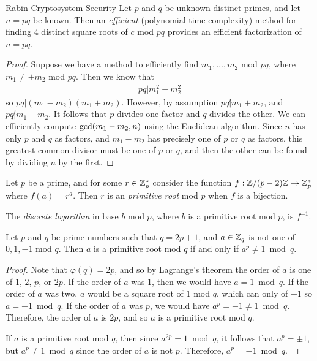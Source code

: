 \begin{thm}{Rabin Cryptosystem Security}\proofbreak
    Let $p$ and $q$ be unknown distinct primes, and let $n = pq$ be known. Then an \emph{efficient} (polynomial time complexity) method for finding $4$ distinct square roots of $c$ mod $pq$ provides an efficient factorization of $n = pq$.
\end{thm}

\begin{proof}
    Suppose we have a method to efficiently find $m_1, \ldots, m_2$ mod $pq$, where $m_1 \neq \pm m_2$ mod $pq$. Then we know that
    \begin{align*}
        pq | m_{1}^2 - m_{2}^2
    \end{align*}
    so $pq | (m_1 - m_2)(m_1 + m_2)$. However, by assumption $pq \not| m_1 + m_2$, and $pq \not| m_1 - m_2$. It follows that $p$ divides one factor and $q$ divides the other. We can efficiently compute $\operatorname{gcd}(m_1 - m_2, n)$ using the Euclidean algorithm. Since $n$ has only $p$ and $q$ as factors, and $m_1 - m_2$ has precisely one of $p$ or $q$ as factors, this greatest common divisor must be one of $p$ or $q$, and then the other can be found by dividing $n$ by the first.
\end{proof}

\begin{defn}
    Let $p$ be a prime, and for some $r \in \mathbb{Z}_{p}^{*}$ consider the function $f: \mathbb{Z}/(p-2)\mathbb{Z} \to \mathbb{Z}_p^{*}$ where $f(a) = r^{a}$. Then $r$ is an \emph{primitive root} mod $p$ when $f$ is a bijection.

    The \emph{discrete logarithm} in base $b$ mod $p$, where $b$ is a primitive root mod $p$, is $f^{-1}$.
\end{defn}

\begin{thm}
    Let $p$ and $q$ be prime numbers such that $q = 2p + 1$, and $a \in \mathbb{Z}_q$ is not one of $0, 1, -1$ mod $q$. Then $a$ is a primitive root mod $q$ if and only if $a^{p} \neq 1 \bmod q$.
\end{thm}

\begin{proof}
    Note that $\varphi(q) = 2p$, and so by Lagrange's theorem the order of $a$ is one of $1$, $2$, $p$, or $2p$. If the order of $a$ was $1$, then we would have $a = 1 \bmod q$. If the order of $a$ was two, $a$ would be a square root of $1$ mod $q$, which can only of $\pm 1$ so $a = -1 \bmod q$. If the order of $a$ was $p$, we would have $a^{p} = -1 \neq 1 \bmod q$. Therefore, the order of $a$ is $2p$, and so $a$ is a primitive root mod $q$.

    If $a$ is a primitive root mod $q$, then since $a^{2p} = 1 \bmod q$, it follows that $a^{p} = \pm 1$, but $a^{p} \neq 1 \bmod q$ since the order of $a$ is not $p$. Therefore, $a^{p} = -1 \bmod q$.
\end{proof}

